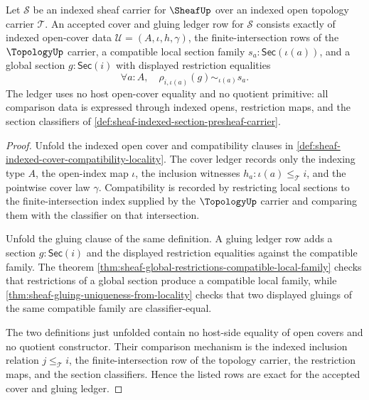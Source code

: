 \begin{theorem}
\label{thm:sheaf-cover-ledger-exactness-obligation}
Let $\mathcal{S}$ be an indexed sheaf carrier for $\SheafUp$ over an indexed open topology carrier $\mathcal{T}$. An accepted cover and gluing ledger row for $\mathcal{S}$ consists exactly of indexed open-cover data $\mathcal{U}=(A,\iota,h,\gamma)$, the finite-intersection rows of the $\TopologyUp$ carrier, a compatible local section family $s_a:\mathsf{Sec}(\iota(a))$, and a global section $g:\mathsf{Sec}(i)$ with displayed restriction equalities
$$
\forall a:A,\quad \rho_{i,\iota(a)}(g)\sim_{\iota(a)}s_a.
$$
The ledger uses no host open-cover equality and no quotient primitive: all comparison data is expressed through indexed opens, restriction maps, and the section classifiers of \autoref{def:sheaf-indexed-section-presheaf-carrier}.
\end{theorem}
\begin{proof}
Unfold the indexed open cover and compatibility clauses in \autoref{def:sheaf-indexed-cover-compatibility-locality}. The cover ledger records only the indexing type $A$, the open-index map $\iota$, the inclusion witnesses $h_a:\iota(a)\le_{\mathcal{T}}i$, and the pointwise cover law $\gamma$. Compatibility is recorded by restricting local sections to the finite-intersection index supplied by the $\TopologyUp$ carrier and comparing them with the classifier on that intersection.

Unfold the gluing clause of the same definition. A gluing ledger row adds a section $g:\mathsf{Sec}(i)$ and the displayed restriction equalities against the compatible family. The theorem \autoref{thm:sheaf-global-restrictions-compatible-local-family} checks that restrictions of a global section produce a compatible local family, while \autoref{thm:sheaf-gluing-uniqueness-from-locality} checks that two displayed gluings of the same compatible family are classifier-equal.

The two definitions just unfolded contain no host-side equality of open covers and no quotient constructor. Their comparison mechanism is the indexed inclusion relation $j\le_{\mathcal{T}} i$, the finite-intersection row of the topology carrier, the restriction maps, and the section classifiers. Hence the listed rows are exact for the accepted cover and gluing ledger.
\end{proof}
